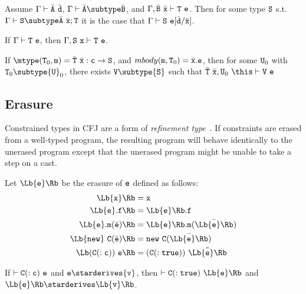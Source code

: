 \begin{lemma}
Assume $\Gamma \vdash \bar{\tt A}\ \bar{\tt d}$, $\Gamma \vdash \bar{\tt A}\subtype \bar{\tt B}$, and $\Gamma, \bar{\tt B}\ \bar{\tt x} \vdash {\tt T}\ {\tt e}$. Then for some type ${\tt S}$ s.t. $\Gamma \vdash {\tt S} \subtype \bar{\tt A}\ \bar{\tt x};{\tt T}$ it is the case that $\Gamma \vdash {\tt S}\ {\tt e}[\bar{\tt d}/\bar{\tt x}]$.
\end{lemma}

\begin{lemma}[Weakening]
If $\Gamma \vdash {\tt T}\ {\tt e}$, then $\Gamma, {\tt S}\ {\tt x}\vdash {\tt T}\ {\tt e}$.
\end{lemma}

\begin{lemma}
If $\mtype({\tt T}_0,{\tt m})=\bar{\tt T}\ \bar{\tt x} : {\tt c}
\rightarrow {\tt S}$, and $mbody({\tt m}, {\tt T}_0)=\bar{\tt x}.{\tt
e}$, then for some ${\tt U}_0$ with ${\tt T}_0 \subtype {\tt U}_0$,
there exists ${\tt V}\subtype {\tt S}$ such that
$\bar{\tt T}\ \bar{\tt x},{\tt U}_0\ \this \vdash {\tt V}\ {\tt e}$
\end{lemma}


\subsection{Erasure}

Constrained types in CFJ are a form of {\em refinement
type}~\cite{refinement-types}.  If constraints are erased from a
well-typed program,
the resulting program will behave identically to the unerased
program except that the unerased program might be unable to take
a step on a cast.

Let $\Lb {\tt e} \Rb$ be the erasure of ${\tt e}$ defined as follows:
\begin{align*}
\Lb {\tt x} \Rb &= {\tt x} \\
\Lb {\tt e}.{\tt f} \Rb &= \Lb {\tt e} \Rb.{\tt f} \\
\Lb {\tt e}.{\tt m}(\bar{\tt e}) \Rb &= \Lb {\tt e} \Rb.{\tt m}(\bar{\Lb {\tt e} \Rb}) \\
\Lb {\tt new}~{\tt C}(\bar{\tt e}) \Rb &= {\tt new}~{\tt C}(\bar{\Lb {\tt e} \Rb}) \\
\Lb ({\tt C}(:{\tt c}))~{\tt e} \Rb &= (\tt C(: {\tt true}))~\bar{\Lb {\tt e} \Rb}
\end{align*}

\begin{theorem}[Erasure]

If $\vdash {\tt C}(:{\tt c})\ {\tt e}$ and ${\tt e} \starderives {\tt v}$,
then $\vdash {\tt C}(:{\tt true})\ \Lb {\tt e} \Rb$ and $\Lb
{\tt e} \Rb \starderives \Lb {\tt v} \Rb$.

\end{theorem}

